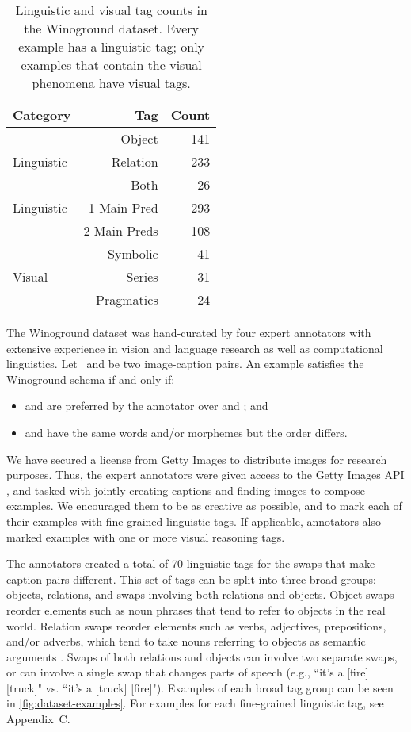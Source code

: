 \documentclass[10pt,twocolumn,letterpaper]{article}
\begin{document}
\begin{table}
\centering
\begin{tabular}{lrr}
\toprule
 Category & Tag    &   Count \\
\midrule
& Object   &     141 \\
 Linguistic & Relation &     233 \\
 & Both &      26 \\\midrule
 Linguistic & 1 Main Pred & 293 \\
 & 2 Main Preds & 108 \\\midrule
 & Symbolic &  41 \\
 Visual & Series &  31 \\
 & Pragmatics &  24\\
\bottomrule
\end{tabular}
\caption{Linguistic and visual tag counts in the Winoground dataset. Every example has a linguistic tag; only examples that contain the visual phenomena have visual tags.}
\label{tab:stats-tag-subset}
\end{table}


The Winoground dataset was hand-curated by four expert annotators with extensive experience in vision and language research as well as computational linguistics. Let~ and  be two image-caption pairs. An example satisfies the Winoground schema if and only if:
\begin{itemize}
    \item  and  are preferred by the annotator over  and ; and
    \item  and  have the same words and/or morphemes but the order differs.
\end{itemize}

We have secured a license from Getty Images to distribute images for research purposes. Thus, the expert annotators were given access to the Getty Images API \cite{getty}, and tasked with jointly creating captions and finding images to compose examples. We encouraged them to be as creative as possible, and to mark each of their examples with fine-grained linguistic tags. If applicable, annotators also marked examples with one or more visual reasoning tags.

The annotators created a total of 70 linguistic tags for the swaps that make caption pairs different. This set of tags can be split into three broad groups: objects, relations, and swaps involving both relations and objects. Object swaps reorder elements such as noun phrases that tend to refer to objects in the real world. Relation swaps reorder elements such as verbs, adjectives, prepositions, and/or adverbs, which tend to take nouns referring to objects as semantic arguments \cite{altshuler2019course}. Swaps of both relations and objects can involve two separate swaps, or can involve a single swap that changes parts of speech (e.g., ``it's a [fire] [truck]" vs. ``it's a [truck] [fire]"). Examples of each broad tag group can be seen in \cref{fig:dataset-examples}. For examples for each fine-grained linguistic tag, see Appendix~C.
\end{document}
